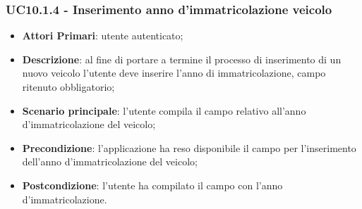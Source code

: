 \subsubsection{UC10.1.4 - Inserimento anno d'immatricolazione veicolo}
\begin{itemize}
	\item \textbf{Attori Primari}: utente autenticato;
	\item \textbf{Descrizione}: al fine di portare a termine il processo di inserimento di un nuovo veicolo l'utente deve inserire l'anno di immatricolazione, campo ritenuto obbligatorio;
	\item \textbf{Scenario principale}: l'utente compila il campo relativo all'anno d'immatricolazione del veicolo;	
	\item \textbf{Precondizione}: l'applicazione ha reso disponibile il campo per l'inserimento dell'anno d'immatricolazione del veicolo;
	\item \textbf{Postcondizione}: l'utente ha compilato il campo con l'anno d'immatricolazione.	
\end{itemize}

